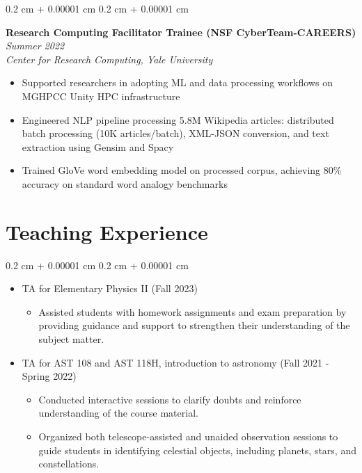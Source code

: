 \documentclass[10pt, letterpaper]{article}
\newenvironment{highlights}{
    \begin{itemize}[
        topsep=0.10 cm,
        parsep=0.10 cm,
        partopsep=0pt,
        itemsep=0pt,
        leftmargin=0.4 cm + 10pt
    ]
}{
    \end{itemize}
}
\newenvironment{highlightsforbulletentries}{
    \begin{itemize}[
        topsep=0.10 cm,
        parsep=0.10 cm,
        partopsep=0pt,
        itemsep=0pt,
        leftmargin=10pt
    ]
}{
    \end{itemize}
}
\newenvironment{onecolentry}{
    \begin{adjustwidth}{
        0.2 cm + 0.00001 cm
    }{
        0.2 cm + 0.00001 cm
    }
}{
    \end{adjustwidth}
}
\begin{document}
\vspace{0.2 cm}

\begin{onecolentry}
  \textbf{Research Computing Facilitator Trainee (NSF CyberTeam-CAREERS)} \hfill\textit{Summer 2022}\\
  \textit{Center for Research Computing, Yale University}

  \begin{highlights}
    \item Supported researchers in adopting ML and data processing workflows on MGHPCC Unity 
    HPC infrastructure
    \item Engineered NLP pipeline processing 5.8M Wikipedia articles: 
        distributed batch processing (10K articles/batch), XML-JSON conversion, and 
        text extraction using Gensim and Spacy
    \item Trained GloVe word embedding model on processed corpus, achieving 
        80\% accuracy on standard word analogy benchmarks
  \end{highlights}
\end{onecolentry}



\section{Teaching Experience}
\begin{onecolentry}
    \begin{highlightsforbulletentries}
      \item TA for Elementary Physics II (Fall 2023)
      \begin{itemize}
        \item Assisted students with homework assignments and exam preparation by providing guidance and support to 
        strengthen their understanding of the subject matter.
      \end{itemize}

      \item TA for AST 108 and AST 118H, introduction to astronomy (Fall 2021 - Spring 2022)
      \begin{itemize}
        \item Conducted interactive sessions to clarify doubts and reinforce understanding of the course material.
        \item Organized both telescope-assisted and unaided observation sessions to guide students in identifying 
        celestial objects, including planets, stars, and constellations.
      \end{itemize}   
    \end{highlightsforbulletentries}
\end{onecolentry}
\end{document}
